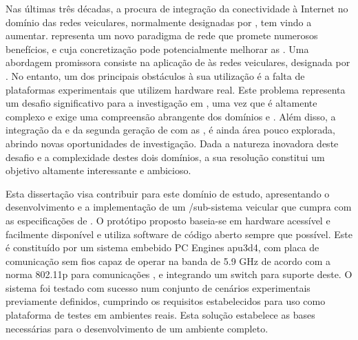 
%

Nas últimas três décadas, a procura de integração da conectividade à Internet no domínio das redes veiculares, normalmente designadas por , tem vindo a aumentar.  representa um novo paradigma de rede que promete numerosos benefícios, e cuja concretização pode potencialmente melhorar as . Uma abordagem promissora consiste na aplicação de  às redes veiculares, designada por . No entanto, um dos principais obstáculos à sua utilização é a falta de plataformas experimentais que utilizem hardware real. Este problema representa um desafio significativo para a investigação em , uma vez que é altamente complexo e exige uma compreensão abrangente dos domínios  e . Além disso, a integração da  e da segunda geração de  com as , é ainda área pouco explorada, abrindo novas oportunidades de investigação. Dada a natureza inovadora deste desafio e a complexidade destes dois domínios, a sua resolução constitui um objetivo altamente interessante e ambicioso.

Esta dissertação visa contribuir para este domínio de estudo, apresentando o desenvolvimento e a implementação de um /sub-sistema  veicular que cumpra com as especificações de . 
O protótipo proposto baseia-se em hardware acessível e facilmente disponível e utiliza software de código aberto sempre que possível. %
Este é constituído por um sistema embebido PC Engines apu3d4, com placa de comunicação sem fios capaz de operar na banda de 5.9 GHz de acordo com a norma  802.11p para comunicações , e integrando um switch   para suporte deste. O sistema foi testado com sucesso num conjunto de cenários experimentais previamente definidos, cumprindo os requisitos estabelecidos para uso como plataforma de testes em ambientes reais. Esta solução estabelece as bases necessárias para o desenvolvimento de um ambiente  completo.



